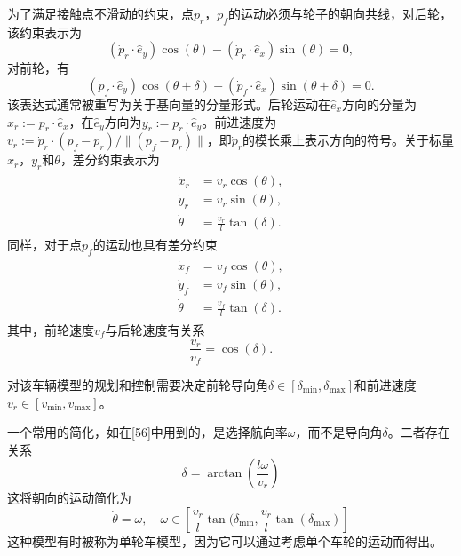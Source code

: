 为了满足接触点不滑动的约束，点$p_r$，$p_f$的运动必须与轮子的朝向共线，对后轮，该约束表示为
\begin{equation}
(\dot{p}_r\cdot \hat{e}_y)\cos(\theta)-(\dot{p}_r\cdot \hat{e}_x)\sin(\theta)=0,
\end{equation}
对前轮，有
\begin{equation}
(\dot{p}_f\cdot \hat{e}_y)\cos(\theta+\delta)-(\dot{p}_f\cdot \hat{e}_x)\sin(\theta+\delta)=0.
\end{equation}
该表达式通常被重写为关于基向量的分量形式。后轮运动在$\hat{e}_x$方向的分量为$x_r := p_r\cdot\hat{e}_x$，在$\hat{e}_y$方向为$y_r:=p_r\cdot \hat{e}_y$。前进速度为$v_r:=\dot{p}_r\cdot(p_f-p_r)/\|(p_f-p_r)\|$，即$\dot{p}_r$的模长乘上表示方向的符号。关于标量$x_r$，$y_r$和$\theta$，差分约束表示为
\begin{align}
\begin{split}
\dot{x}_r&= v_r\cos(\theta),\\
\dot{y}_r&= v_r\sin(\theta),\\
\dot{\theta}&=\frac{v_r}{l}\tan(\delta).
\end{split}
\end{align}
同样，对于点$p_f$的运动也具有差分约束
\begin{align}
\begin{split}
\dot{x}_f&= v_f\cos(\theta),\\
\dot{y}_f&= v_f\sin(\theta),\\
\dot{\theta}&=\frac{v_f}{l}\tan(\delta).
\end{split}
\label{eq:vf}
\end{align}
其中，前轮速度$v_f$与后轮速度有关系
\begin{equation}
\frac{v_r}{v_f}=\cos(\delta).
\end{equation}

对该车辆模型的规划和控制需要决定前轮导向角$\delta\in [\delta_{\min}, \delta_{\max}]$和前进速度$v_r\in [v_{\min}, v_{\max}]$。

一个常用的简化，如在[56]中用到的，是选择航向率$\omega$，而不是导向角$\delta$。二者存在关系
\begin{equation}
\delta=\arctan(\frac{l\omega}{v_r})
\end{equation}
这将朝向的运动简化为
\begin{equation}
\dot{\theta}=\omega, \quad \omega\in [\frac{v_r}{l}\tan(\delta_{\min}, \frac{v_r}{l}\tan(\delta_{\max})]
\end{equation}
这种模型有时被称为单轮车模型，因为它可以通过考虑单个车轮的运动而得出。

